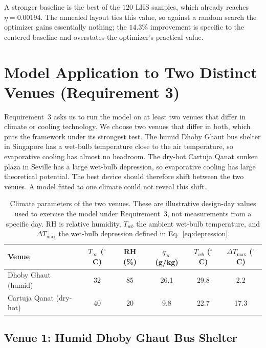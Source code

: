 \documentclass[11pt]{article}
\begin{document}
A stronger baseline is the best of the $120$ LHS samples, which already reaches
$\eta=0.00194$. The annealed layout ties this value, so against a random search
the optimizer gains essentially nothing; the $14.3\%$ improvement is specific
to the centered baseline and overstates the optimizer's practical value.

\section{Model Application to Two Distinct Venues (Requirement 3)}

Requirement~3 asks us to run the model on at least two venues that differ in
climate or cooling technology. We choose two venues that differ in both, which
puts the framework under its strongest test. The humid Dhoby Ghaut bus shelter
in Singapore has a wet-bulb temperature close to the air temperature, so
evaporative cooling has almost no headroom. The dry-hot Cartuja Qanat sunken
plaza in Seville has a large wet-bulb depression, so evaporative cooling has
large theoretical potential. The best device should therefore shift between the
two venues. A model fitted to one climate could not reveal this shift.

\begin{table}[H]
\centering
\caption{Climate parameters of the two venues. These are illustrative design-day
values used to exercise the model under Requirement~3, not measurements from a
specific day. RH is relative humidity, $T_{wb}$ the ambient wet-bulb temperature,
and $\Delta T_{\max}$ the wet-bulb depression defined in Eq.~\eqref{eq:depression}.}
\label{tab:venueparams}
\begin{tabular}{@{}lccccc@{}}
\toprule
\textbf{Venue} & $T_{\infty}$ ($^\circ$C) & RH (\%) & $q_{\infty}$ (g/kg) & $T_{wb}$ ($^\circ$C) & $\Delta T_{\max}$ ($^\circ$C) \\
\midrule
Dhoby Ghaut (humid) & 32 & 85 & 26.1 & 29.8 & 2.2 \\
Cartuja Qanat (dry-hot) & 40 & 20 & 9.8 & 22.7 & 17.3 \\
\bottomrule
\end{tabular}
\end{table}

\subsection{Venue 1: Humid Dhoby Ghaut Bus Shelter}
\end{document}
